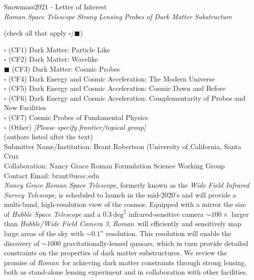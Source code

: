 \documentclass[11pt]{article}
\newcommand{\RST}{\emph{Roman}~}
\begin{document}
\begin{raggedright} 
\huge
Snowmass2021 - Letter of Interest \hfill \\[+1em]
\textit{Roman Space Telescope Strong Lensing Probes of Dark Matter Substructure} \hfill \\[+1em]
\end{raggedright}

\normalsize

  (check all that apply $\square$/$\blacksquare$)

\noindent $\square$ (CF1) Dark Matter: Particle Like \\
\noindent $\square$ (CF2) Dark Matter: Wavelike  \\ 
\noindent $\blacksquare$ (CF3) Dark Matter: Cosmic Probes  \\
\noindent $\square$ (CF4) Dark Energy and Cosmic Acceleration: The Modern Universe \\
\noindent $\square$ (CF5) Dark Energy and Cosmic Acceleration: Cosmic Dawn and Before \\
\noindent $\square$ (CF6) Dark Energy and Cosmic Acceleration: Complementarity of Probes and New Facilities \\
\noindent $\square$ (CF7) Cosmic Probes of Fundamental Physics \\
\noindent $\square$ (Other) {\it [Please specify frontier/topical group]} \\

 (authors listed after the text)\\
Submitter Name/Institution: Brant Robertson (University of California, Santa Cruz\\
Collaboration: Nancy Grace Roman Formulation Science Working Group\\
Contact Email: brant@ucsc.edu\\

\emph{Nancy Grace Roman Space Telescope}, formerly known as 
the \emph{Wide Field Infrared Survey Telescope}, is scheduled to launch in the mid-2020's and will provide a
multi-band, high-resolution view of the cosmos. Equipped with a mirror the size of \emph{Hubble
Space Telescope} and a $0.3~\mathrm{deg}^2$ infrared-sensitive camera $\sim100\times$ larger than \emph{Hubble/Wide Field Camera 3},
\RST will efficiently and sensitively map large areas of the sky with $\sim0.1$'' resolution.
This resolution will enable the discovery of $\sim 1000$ gravitationally-lensed quasars, which 
in turn provide detailed constraints on the properties of dark matter substructures. We
review the promise of \RST for achieving dark matter constraints through strong lensing,
both as stand-alone lensing experiment and in collaboration with other facilities.
\end{document}
